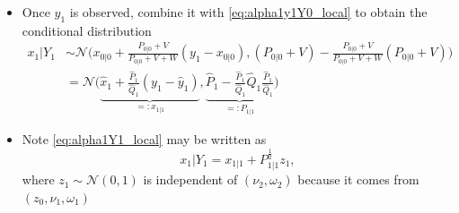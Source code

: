 \documentclass[12pt,a4paper]{article}
\begin{document}
\begin{itemize}
\begin{itemize}
\begin{itemize}
\begin{align}
\begin{bmatrix}
            x_{0|0}
          \end{bmatrix},
          \begin{bmatrix}
            P_{0|0} + V & P_{0|0} + V\\
            P_{0|0} + V & P_{0|0} + V + W\\
          \end{bmatrix}
          \right),
          \label{eq:alpha1y1Y0_local}%
      \end{align}
      from which we can compute the marginal distributions as
      \begin{equation}\label{eq:alpha1Y0_local}%
        \underbrace{
        x_{1}|Y_{0}}_{\text{prior on $x_{1}$}}
        \sim \mathcal{N}(\underbrace{x_{0|0}}_{=:\hat{x}_{1}}, \underbrace{P_{0|0} + V}_{=:\hat{P}_{1}}),
        \quad
        \underbrace{
        y_{1}|Y_{0}}_{\text{forecast on $y_{1}$}}
        \sim \mathcal{N}(\underbrace{\hat{x}_{1}}_{=:\hat{y}_{1}}, \underbrace{\hat{P}_{1}+ W}_{=:\hat{Q}_{1}})
      \end{equation}

    \item Once $y_{1}$ is observed,
      combine it with \eqref{eq:alpha1y1Y0_local}
      to obtain the conditional
      distribution
      \begin{align}
        x_{1}|Y_{1}
        & \sim
          \mathcal{N} \bigg(
          x_{0|0} + \frac{P_{0|0}+V}{P_{0|0}+V+W}(y_{1}-x_{0|0}),
          (P_{0|0}+V) - \frac{P_{0|0}+V}{P_{0|0}+V+W}(P_{0|0}+V)
          \bigg)
          \nonumber \\
        & =
          \mathcal{N} \bigg(
          \underbrace{\hat{x}_{1} + \frac{\hat{P}_{1}}{\hat{Q}_{1}}(y_{1}-\hat{y}_{1})}_{=:x_{1|1}},
          \underbrace{\hat{P}_{1} - \frac{\hat{P}_{1}}{\hat{Q}_{1}}\hat{Q}_{1}\frac{\hat{P}_{1}}{\hat{Q}_{1}}}_{=:P_{1|1}}
          \bigg)
          \label{eq:alpha1Y1_local}%
      \end{align}

    \item Note \eqref{eq:alpha1Y1_local} may be written as
      \begin{equation}\label{eq:alpha1Y1z_local}%
        x_{1}|Y_{1} = x_{1|1} + P_{1|1}^{\frac{1}{2}}z_{1},
      \end{equation}
      where $z_{1}\sim \mathcal{N}(0,1)$ is independent of
      $(\nu_{2},\omega_{2})$ because it comes from
      $(z_{0},\nu_{1},\omega_{1})$

    \end{itemize}


\end{itemize}
\end{itemize}
\end{document}
